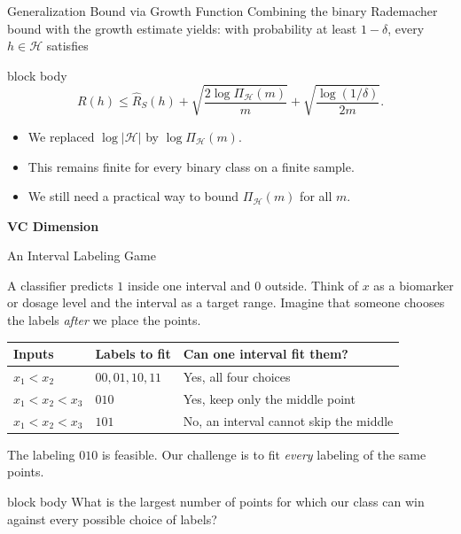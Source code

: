 \documentclass[aspectratio=169,10pt]{beamer}
\newcommand{\Hc}{\mathcal{H}}
\newcommand{\Rhat}{\widehat{R}_S}
\newcommand{\PiH}{\Pi_{\Hc}}
\newcommand{\abs}[1]{\left\lvert #1\right\rvert}
\newcommand{\SectionSlide}[2]{%
  \begin{frame}
    \centering
    \vfill
    {\color{slideorange}\fontsize{29}{34}\selectfont\bfseries #1\par}
    \vspace{0.38cm}
    {\color{midgray}\fontsize{16}{21}\selectfont #2\par}
    \vfill
  \end{frame}
}
\newcommand{\KeyBox}[1]{%
  \begin{beamercolorbox}[rounded=true,sep=0.22cm,wd=\linewidth]{block body}
    #1
  \end{beamercolorbox}%
}
\begin{document}
\begin{frame}[t]{Generalization Bound via Growth Function}
  \vspace{0.04cm}
  Combining the binary Rademacher bound with the growth estimate yields: with probability at least $1-\delta$, every $h\in\Hc$ satisfies
  \begin{beamercolorbox}[rounded=true,sep=0.20cm,wd=\linewidth]{block body}
    \[
      \boxed{
      R(h)
      \le \Rhat(h)
      +\sqrt{\frac{2\log\PiH(m)}{m}}
      +\sqrt{\frac{\log(1/\delta)}{2m}}.}
    \]
  \end{beamercolorbox}
  \vspace{0.15cm}
  \begin{itemize}
    \setlength{\itemsep}{0.10cm}
    \item We replaced $\log\abs{\Hc}$ by $\log\PiH(m)$.
    \item This remains finite for every binary class on a finite sample.
    \item We still need a practical way to bound $\PiH(m)$ for all $m$.
  \end{itemize}
\end{frame}

\SectionSlide{VC Dimension}{}

\begin{frame}[t]{An Interval Labeling Game}
  \vspace{0.04cm}
  \small

  A classifier predicts $1$ inside one interval and $0$ outside. Think of
  $x$ as a biomarker or dosage level and the interval as a target range.
  Imagine that someone chooses the labels \emph{after} we place the points.
  \begin{center}
  \renewcommand{\arraystretch}{1.15}
  \begin{tabular}{lll}
    \toprule
    Inputs & Labels to fit & Can one interval fit them?\\
    \midrule
    $x_1<x_2$ & $00,01,10,11$ & Yes, all four choices\\
    $x_1<x_2<x_3$ & $010$ & Yes, keep only the middle point\\
    $x_1<x_2<x_3$ & $101$ & No, an interval cannot skip the middle\\
    \bottomrule
  \end{tabular}
  \end{center}
  The labeling $010$ is feasible. Our challenge is to fit
  \emph{every} labeling of the same points.
  \vspace{0.20cm}
  \KeyBox{What is the largest number of points for which our class can win
  against every possible choice of labels?}

\end{frame}
\end{document}
